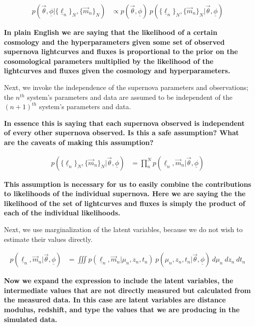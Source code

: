 \documentclass[12pt, onecolumn]{emulateapj}
\newcommand{\textul}{\underline}
\begin{document}
\begin{align}
p(\vec{\theta}, \textul{\phi} | \{\textul{\ell}_{n}\}_{N}, \{\vec{m}_{n}\}_{N}) &\propto p(\vec{\theta}, \textul{\phi})\ p(\{\textul{\ell}_{n}\}_{N}, \{\vec{m}_{n}\}_{N} | \vec{\theta}, \textul{\phi})
\end{align}

{\bf In plain English we are saying that the likelihood of a certain cosmology and the hyperparameters given some set of observed supernova lightcurves and fluxes is proportional to the prior on the cosomological parameters multiplied by the likelihood of the lightcurves and fluxes given the cosmology and hyperparameters.}

Next, we invoke the independence of the supernova parameters and observations; the $n^{th}$ system's parameters and data are assumed to be independent of the $(n+1)^{th}$ system's parameters and data.

{\bf In essence this is saying that each supernova observed is independent of every other supernova observed. Is this a safe assumption? What are the caveats of making this assumption?}

\begin{align}
p(\{\textul{\ell}_{n}\}_{N}, \{\vec{m}_{n}\}_{N} | \vec{\theta}, \textul{\phi}) &= \prod_{n}^{N}p(\textul{\ell}_{n}, \vec{m}_{n} | \vec{\theta}, \textul{\phi})
\end{align}

{\bf This assumption is necessary for us to easily combine the contributions to likelihoods of the individual supernova. Here we are saying the the likelihood of the set of lightcurves and fluxes is simply the product of each of the individual likelihoods.}

Next, we use marginalization of the latent variables, because we do not wish to estimate their values directly.

\begin{align}
p(\textul{\ell}_{n}, \vec{m}_{n} | \vec{\theta}, \textul{\phi}) &= \iiint p(\textul{\ell}_{n}, \vec{m}_{n} | \mu_{n}, z_{n}, t_{n})\ p(\mu_{n}, z_{n}, t_{n} | \vec{\theta}, \textul{\phi})\ d\mu_{n}\ dz_{n}\ dt_{n}
\end{align}

{\bf Now we expand the expression to include the latent variables, the intermediate values that are not directly measured but calculated from the measured data. In this case are latent variables are distance modulus, redshift, and type the values that we are producing in the simulated data.}
\end{document}
